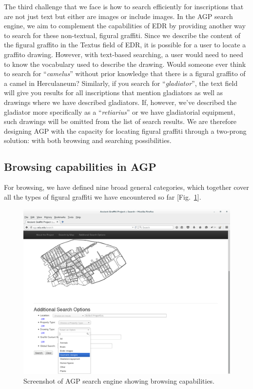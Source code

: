 \documentclass[amsthm,ebook]{saparticle}
\begin{document}
\noindent The third challenge that we face is how to search efficiently for inscriptions that are not just text but either are
images or include images. In the AGP search engine, we aim to complement the capabilities of EDR by providing another
way to search for these non-textual, figural graffiti. Since we describe the content of the figural graffito in the
Textus field of EDR, it is possible for a user to locate a graffito drawing. However, with text-based searching, a user
would need to need to know the vocabulary used to describe the drawing. Would someone ever think to search for
``\emph{camelus}'' without prior knowledge that there is a figural graffito of a camel in Herculaneum? Similarly, if you
search for ``\emph{gladiator}'', the text field will give you results for all inscriptions that mention gladiators as well as
drawings where we have described gladiators. If, however, we’ve described the gladiator more specifically as a
``\emph{retiarius}'' or we have gladiatorial equipment, such drawings will be omitted from the list of search results.
\newpage
We are therefore designing AGP with the capacity for locating figural graffiti through a two-prong solution: with
both browsing and searching possibilities. 




\subsection{Browsing capabilities in AGP}


\noindent For browsing, we have defined nine broad general categories, which together cover all the types of figural graffiti
we have encountered so far [Fig.~\ref{fig:8}]. 

\begin{figure}[!hbp]
\centering
 \includegraphics[width=0.9\columnwidth]{EAGLE2016BenefielSypniewski-img008.png}
\caption{Screenshot of AGP search engine showing browsing capabilities.}
\label{fig:8}
\end{figure}
 
\end{document}
